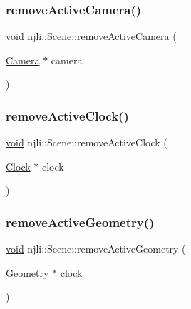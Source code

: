 \mbox{\label{classnjli_1_1_scene_a27894158aebeba1a3251efa33c41aa71}} 
\subsubsection{\texorpdfstring{remove\+Active\+Camera()}{removeActiveCamera()}}
{\footnotesize\ttfamily \mbox{\hyperlink{_thread_8h_af1e856da2e658414cb2456cb6f7ebc66}{void}} njli\+::\+Scene\+::remove\+Active\+Camera (\begin{DoxyParamCaption}\item[{\mbox{\hyperlink{classnjli_1_1_camera}{Camera}} $\ast$}]{camera }\end{DoxyParamCaption})\hspace{0.3cm}{\ttfamily [protected]}}

\mbox{\label{classnjli_1_1_scene_a31e1f83511a7340324c21cb1285ed0a2}} 
\subsubsection{\texorpdfstring{remove\+Active\+Clock()}{removeActiveClock()}}
{\footnotesize\ttfamily \mbox{\hyperlink{_thread_8h_af1e856da2e658414cb2456cb6f7ebc66}{void}} njli\+::\+Scene\+::remove\+Active\+Clock (\begin{DoxyParamCaption}\item[{\mbox{\hyperlink{classnjli_1_1_clock}{Clock}} $\ast$}]{clock }\end{DoxyParamCaption})\hspace{0.3cm}{\ttfamily [protected]}}

\mbox{\label{classnjli_1_1_scene_af4f7c3b7b136bbf4f8aad6640814b9a3}} 
\subsubsection{\texorpdfstring{remove\+Active\+Geometry()}{removeActiveGeometry()}}
{\footnotesize\ttfamily \mbox{\hyperlink{_thread_8h_af1e856da2e658414cb2456cb6f7ebc66}{void}} njli\+::\+Scene\+::remove\+Active\+Geometry (\begin{DoxyParamCaption}\item[{\mbox{\hyperlink{classnjli_1_1_geometry}{Geometry}} $\ast$}]{clock }\end{DoxyParamCaption})\hspace{0.3cm}{\ttfamily [protected]}}

